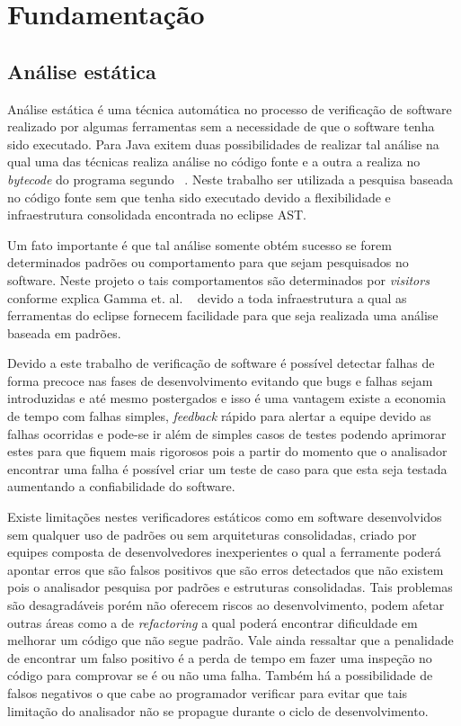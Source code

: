 \chapter{Fundamentação}
\section{Análise estática}
Análise estática é uma técnica automática no processo de verificação de software realizado por algumas ferramentas sem a necessidade de que o software tenha sido executado. Para Java exitem duas possibilidades de realizar tal análise na qual uma das técnicas realiza análise no código fonte e a outra a realiza no {\it bytecode} do programa segundo ~\cite{Ayewah:2008:USA:1439186.1439221}. Neste trabalho ser utilizada a pesquisa baseada no código fonte sem que tenha sido executado devido a flexibilidade e infraestrutura consolidada encontrada no eclipse AST.

Um fato importante é que tal análise somente obtém sucesso se forem determinados padrões ou comportamento para que sejam pesquisados no software. Neste projeto o tais comportamentos são determinados por {\it visitors} conforme explica Gamma et. al. ~\cite{Gamma:1995} devido a toda infraestrutura a qual as ferramentas do eclipse fornecem facilidade para que seja realizada uma análise baseada em padrões.

Devido a este trabalho de verificação de software é possível detectar falhas de forma precoce nas fases de  desenvolvimento evitando que bugs e falhas sejam introduzidas e até mesmo postergados e isso é uma vantagem existe a economia de tempo com falhas simples, {\it  feedback} rápido para alertar a equipe devido as falhas ocorridas e pode-se ir além de simples casos de testes podendo aprimorar estes para que  fiquem mais rigorosos pois a partir do momento que o analisador encontrar uma falha é possível criar um teste de caso para que esta seja testada aumentando a confiabilidade do software.

Existe limitações nestes verificadores estáticos como em software desenvolvidos sem qualquer uso de padrões ou sem arquiteturas consolidadas, criado por equipes composta de desenvolvedores inexperientes o qual a ferramente poderá apontar erros que são falsos positivos que são erros detectados que não existem pois o analisador pesquisa por padrões e estruturas consolidadas. Tais problemas são desagradáveis porém não oferecem riscos ao desenvolvimento, podem afetar outras áreas como a de {\it refactoring} a qual poderá encontrar dificuldade em melhorar um código que não segue padrão. Vale ainda ressaltar que a penalidade de encontrar um falso positivo é a perda de tempo em fazer uma inspeção no código para comprovar se é ou não uma falha. Também há a possibilidade de falsos negativos o que cabe ao programador verificar para evitar que tais limitação do analisador não se propague durante o ciclo de desenvolvimento.